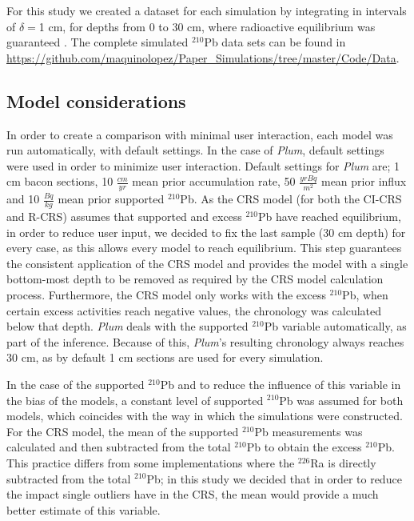 \documentclass [10pt] {article}
\begin{document}
For this study we created a dataset for each simulation by integrating in intervals of $\delta =$1 cm, for depths from  0 to 30 cm, where radioactive equilibrium was guaranteed \citep{Aquino2018}.
The complete simulated $^{210}$Pb data sets can be found in \url{https://github.com/maquinolopez/Paper_Simulations/tree/master/Code/Data}.

\subsection{Model considerations}
In order to create a comparison with minimal user interaction, each model was run automatically, with default settings.
In the case of \textit{Plum}, default settings were used in order to minimize user interaction.
Default settings for \textit{Plum} are; 1 cm bacon sections, 10 $\frac{cm}{yr}$ mean prior accumulation rate, 50 $\frac{yr Bq}{m^2}$ mean prior influx and 10 $\frac{Bq}{kg}$ mean prior supported $^{210}$Pb.
As the CRS model (for both the CI-CRS and R-CRS) assumes that supported and excess $^{210}$Pb have reached equilibrium, in order to reduce user input, we decided to fix the last sample (30 cm depth) for every case, as this allows every model to reach equilibrium.
This step guarantees the consistent application of the CRS model and provides the model with a single bottom-most depth to be removed as required by the CRS model calculation process. 
Furthermore, the CRS model only works with the excess $^{210}$Pb, when certain excess activities reach negative values, the chronology was calculated below that depth.
\textit{Plum} deals with the supported $^{210}$Pb variable automatically, as part of the inference.
Because of this, \textit{Plum}'s resulting chronology always reaches 30 cm, as by default 1 cm sections are used for every simulation.

In the case of the supported $^{210}$Pb and to reduce the influence of this variable in the bias of the models, a constant level of supported $^{210}$Pb was assumed for both models, which coincides with the way in which the simulations were constructed.
For the CRS model, the mean of the supported $^{210}$Pb measurements was calculated and then subtracted from the total $^{210}$Pb to obtain the excess $^{210}$Pb.
This practice differs from some implementations where the $^{226}$Ra is directly subtracted from the total $^{210}$Pb; in this study we decided that in order to reduce the impact single outliers have in the CRS, the mean would provide a much better estimate of this variable.
\end{document}
